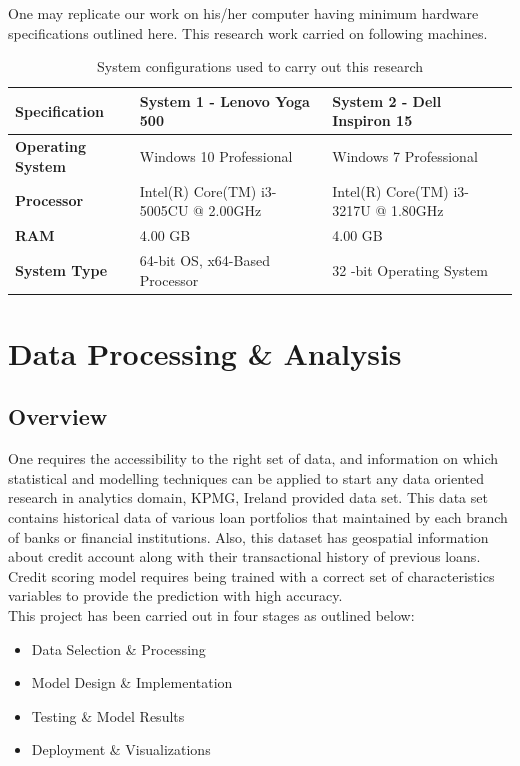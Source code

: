 One may replicate our work on his/her computer having minimum hardware specifications outlined here. This research work carried on following machines. 

\begin{table}[!htb]
\centering
\caption{System configurations used to carry out this research}
\label{osc4}
\begin{tabular}{|p{3cm}|p{5cm}|p{5cm}|}
\toprule
\textbf{Specification}    & \textbf{System 1 - Lenovo Yoga 500}   & \textbf{System 2 - Dell Inspiron 15} \\ \midrule
\textbf{Operating System} & Windows 10 Professional               & Windows 7 Professional               \\
\textbf{Processor}        & Intel(R) Core(TM) i3-5005CU @ 2.00GHz & Intel(R) Core(TM) i3-3217U @ 1.80GHz \\
\textbf{RAM}              & 4.00 GB                               & 4.00 GB                              \\
\textbf{System Type}      & 64-bit OS, x64-Based Processor        & 32 -bit Operating System             \\ \bottomrule
\end{tabular}
\end{table}


\section{Data Processing \& Analysis}\label{ch4.3}

\subsection{Overview}
One requires the accessibility to the right set of data, and information on which statistical and modelling techniques can be applied to start any data oriented research in analytics domain, KPMG, Ireland provided data set. This data set contains historical data of various loan portfolios that maintained by each branch of banks or financial institutions. Also, this dataset has geospatial information about credit account along with their transactional history of previous loans. Credit scoring model requires being trained with a correct set of characteristics variables to provide the prediction with high accuracy.\\

This project has been carried out in four stages as outlined below:
\begin{itemize}
  \item Data Selection \& Processing
  \item Model Design \& Implementation
  \item Testing \& Model Results
  \item Deployment \& Visualizations
\end{itemize}

